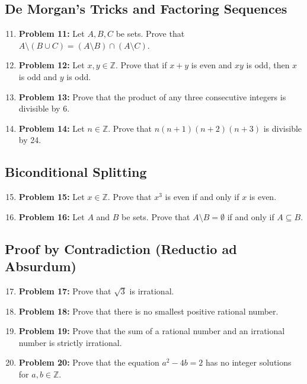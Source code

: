 \documentclass[11pt]{article}
\begin{document}
\subsection{De Morgan's Tricks and Factoring Sequences}
\begin{enumerate}
    \setcounter{enumi}{10}
    \item \textbf{Problem 11:} Let $A, B, C$ be sets. Prove that $A \setminus (B \cup C) = (A \setminus B) \cap (A \setminus C)$.
    \item \textbf{Problem 12:} Let $x, y \in \mathbb{Z}$. Prove that if $x+y$ is even and $xy$ is odd, then $x$ is odd and $y$ is odd.
    \item \textbf{Problem 13:} Prove that the product of any three consecutive integers is divisible by 6.
    \item \textbf{Problem 14:} Let $n \in \mathbb{Z}$. Prove that $n(n+1)(n+2)(n+3)$ is divisible by 24.
\end{enumerate}

\subsection{Biconditional Splitting}
\begin{enumerate}
    \setcounter{enumi}{14}
    \item \textbf{Problem 15:} Let $x \in \mathbb{Z}$. Prove that $x^3$ is even if and only if $x$ is even.
    \item \textbf{Problem 16:} Let $A$ and $B$ be sets. Prove that $A \setminus B = \emptyset$ if and only if $A \subseteq B$.
\end{enumerate}

\subsection{Proof by Contradiction (Reductio ad Absurdum)}
\begin{enumerate}
    \setcounter{enumi}{16}
    \item \textbf{Problem 17:} Prove that $\sqrt{3}$ is irrational.
    \item \textbf{Problem 18:} Prove that there is no smallest positive rational number.
    \item \textbf{Problem 19:} Prove that the sum of a rational number and an irrational number is strictly irrational.
    \item \textbf{Problem 20:} Prove that the equation $a^2 - 4b = 2$ has no integer solutions for $a, b \in \mathbb{Z}$.
\end{enumerate}
\end{document}
